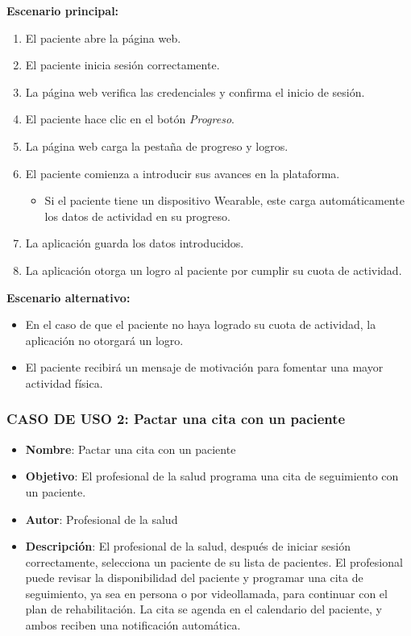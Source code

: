 \documentclass{article}
\begin{document}
\textbf{Escenario principal:}
\begin{enumerate}
	\item El paciente abre la página web.
	\item El paciente inicia sesión correctamente.
	\item La página web verifica las credenciales y confirma el inicio de sesión.
	\item El paciente hace clic en el botón \textit{Progreso}.
	\item La página web carga la pestaña de progreso y logros.
	\item El paciente comienza a introducir sus avances en la plataforma.
	\begin{itemize}
		\item Si el paciente tiene un dispositivo Wearable, este carga automáticamente los datos de actividad en su progreso.
	\end{itemize}
	\item La aplicación guarda los datos introducidos.
	\item La aplicación otorga un logro al paciente por cumplir su cuota de actividad.
\end{enumerate}

\textbf{Escenario alternativo:}
\begin{itemize}
	\item En el caso de que el paciente no haya logrado su cuota de actividad, la aplicación no otorgará un logro.
	\item El paciente recibirá un mensaje de motivación para fomentar una mayor actividad física.
\end{itemize}


\subsubsection*{CASO DE USO 2: Pactar una cita con un paciente}

\begin{itemize}
	\item \textbf{Nombre}: Pactar una cita con un paciente
	\item \textbf{Objetivo}: El profesional de la salud programa una cita de seguimiento con un paciente.
	\item \textbf{Autor}: Profesional de la salud
	\item \textbf{Descripción}: 
	El profesional de la salud, después de iniciar sesión correctamente, selecciona un paciente de su lista de pacientes. El profesional puede revisar la disponibilidad del paciente y programar una cita de seguimiento, ya sea en persona o por videollamada, para continuar con el plan de rehabilitación. La cita se agenda en el calendario del paciente, y ambos reciben una notificación automática.
\end{itemize}
\end{document}
